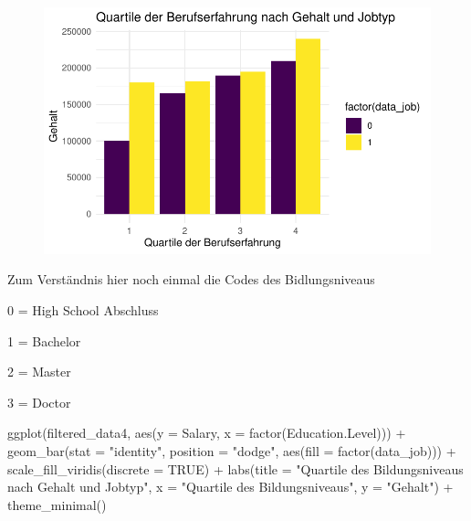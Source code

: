 \documentclass[
  letterpaper,
  DIV=11,
  numbers=noendperiod]{scrartcl}
\newenvironment{Shaded}{\begin{snugshade}}{\end{snugshade}}
\newcommand{\AttributeTok}[1]{\textcolor[rgb]{0.40,0.45,0.13}{#1}}
\newcommand{\ConstantTok}[1]{\textcolor[rgb]{0.56,0.35,0.01}{#1}}
\newcommand{\FunctionTok}[1]{\textcolor[rgb]{0.28,0.35,0.67}{#1}}
\newcommand{\NormalTok}[1]{\textcolor[rgb]{0.00,0.23,0.31}{#1}}
\newcommand{\SpecialCharTok}[1]{\textcolor[rgb]{0.37,0.37,0.37}{#1}}
\newcommand{\StringTok}[1]{\textcolor[rgb]{0.13,0.47,0.30}{#1}}
\begin{document}
\begin{figure}[H]

{\centering \includegraphics{main_doc_files/figure-pdf/unnamed-chunk-91-1.pdf}

}

\end{figure}

Zum Verständnis hier noch einmal die Codes des Bidlungsniveaus

0 = High School Abschluss

1 = Bachelor

2 = Master

3 = Doctor

\begin{Shaded}
\begin{Highlighting}[]
\FunctionTok{ggplot}\NormalTok{(filtered\_data4, }\FunctionTok{aes}\NormalTok{(}\AttributeTok{y =}\NormalTok{ Salary, }\AttributeTok{x =} \FunctionTok{factor}\NormalTok{(Education.Level))) }\SpecialCharTok{+}
  \FunctionTok{geom\_bar}\NormalTok{(}\AttributeTok{stat =} \StringTok{"identity"}\NormalTok{, }\AttributeTok{position =} \StringTok{"dodge"}\NormalTok{, }\FunctionTok{aes}\NormalTok{(}\AttributeTok{fill =} \FunctionTok{factor}\NormalTok{(data\_job))) }\SpecialCharTok{+}
  \FunctionTok{scale\_fill\_viridis}\NormalTok{(}\AttributeTok{discrete =} \ConstantTok{TRUE}\NormalTok{) }\SpecialCharTok{+}
  \FunctionTok{labs}\NormalTok{(}\AttributeTok{title =} \StringTok{"Quartile des Bildungsniveaus nach Gehalt und Jobtyp"}\NormalTok{,}
       \AttributeTok{x =} \StringTok{"Quartile des Bildungsniveaus"}\NormalTok{,}
       \AttributeTok{y =} \StringTok{"Gehalt"}\NormalTok{) }\SpecialCharTok{+}
  \FunctionTok{theme\_minimal}\NormalTok{()}
\end{Highlighting}
\end{Shaded}
\end{document}
